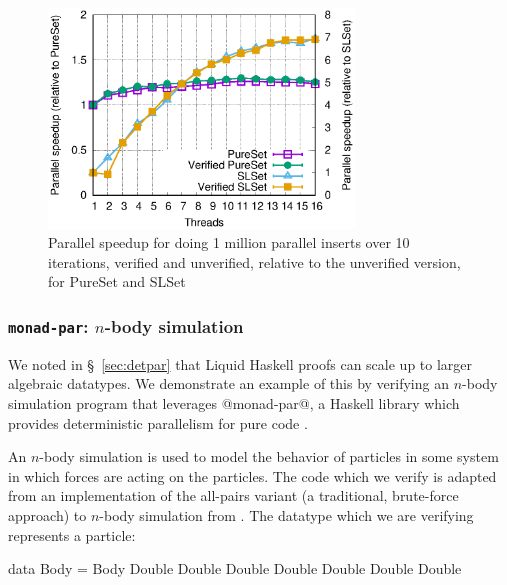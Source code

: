 
\begin{figure}
  \begin{center}
    \includegraphics[width=3.2in]{text/refinementreflection/set.eps}
  \end{center}
  \caption{Parallel speedup for doing 1 million parallel inserts over 10
    iterations, verified and unverified, relative to the unverified version,
    for PureSet and SLSet}
  \label{fig:set}
\end{figure}

\subsubsection{\texttt{monad-par}: $n$-body simulation}
\label{sec:nbody}

We noted in \S~\ref{sec:detpar} that Liquid Haskell proofs can scale up to
larger algebraic datatypes. We demonstrate an example of this by verifying an
$n$-body simulation program that leverages @monad-par@, a Haskell library which
provides deterministic parallelism for pure code \cite{monad-par}.

An $n$-body simulation is used to model the behavior of particles in some system
in which forces are acting on the particles. The code which we verify is adapted
from an implementation of the all-pairs variant (a traditional, brute-force
approach) to $n$-body simulation from \cite{parallel-n-body}. The datatype which
we are verifying represents a particle:

\begin{code}
data Body = Body Double Double Double Double
                 Double Double Double
\end{code}

